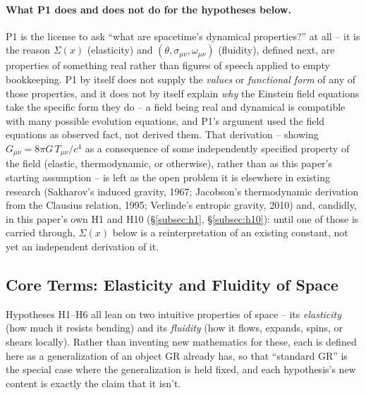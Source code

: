 \documentclass[12pt, a4paper]{article}
\begin{document}
\paragraph{What P1 does and does not do for the hypotheses below.}
P1 is the license to ask ``what are spacetime's dynamical
properties?'' at all -- it is the reason $\Sigma(x)$ (elasticity) and
$(\theta,\sigma_{\mu\nu},\omega_{\mu\nu})$ (fluidity), defined next,
are properties of something real rather than figures of speech
applied to empty bookkeeping. P1 by itself does not supply the
\emph{values} or \emph{functional form} of any of those properties,
and it does not by itself explain \emph{why} the Einstein field
equations take the specific form they do -- a field being real and
dynamical is compatible with many possible evolution equations, and
P1's argument used the field equations as observed fact, not derived
them. That derivation -- showing $G_{\mu\nu}=8\pi G\,T_{\mu\nu}/c^4$
as a consequence of some independently specified property of the
field (elastic, thermodynamic, or otherwise), rather than as this
paper's starting assumption -- is left as the open problem it is
elsewhere in existing research (Sakharov's induced gravity, 1967;
Jacobson's thermodynamic derivation from the Clausius relation, 1995;
Verlinde's entropic gravity, 2010) and, candidly, in this paper's own
H1 and H10 (\S\ref{subsec:h1}, \S\ref{subsec:h10}): until one of
those is carried through, $\Sigma(x)$ below is a reinterpretation of
an existing constant, not yet an independent derivation of it.

\subsection{Core Terms: Elasticity and Fluidity of Space}
\label{subsec:core_terms}
Hypotheses H1--H6 all lean on two intuitive properties of space --
its \emph{elasticity} (how much it resists bending) and its
\emph{fluidity} (how it flows, expands, spins, or shears locally).
Rather than inventing new mathematics for these, each is defined here
as a generalization of an object GR already has, so that ``standard
GR'' is the special case where the generalization is held fixed, and
each hypothesis's new content is exactly the claim that it isn't.
\end{document}
